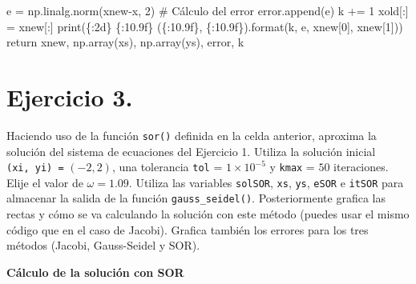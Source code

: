 \documentclass[
  letterpaper,
  DIV=11,
  numbers=noendperiod]{scrreprt}
\newenvironment{Shaded}{\begin{snugshade}}{\end{snugshade}}
\newcommand{\BuiltInTok}[1]{\textcolor[rgb]{0.00,0.23,0.31}{#1}}
\newcommand{\CommentTok}[1]{\textcolor[rgb]{0.37,0.37,0.37}{#1}}
\newcommand{\ControlFlowTok}[1]{\textcolor[rgb]{0.00,0.23,0.31}{#1}}
\newcommand{\DecValTok}[1]{\textcolor[rgb]{0.68,0.00,0.00}{#1}}
\newcommand{\NormalTok}[1]{\textcolor[rgb]{0.00,0.23,0.31}{#1}}
\newcommand{\OperatorTok}[1]{\textcolor[rgb]{0.37,0.37,0.37}{#1}}
\newcommand{\SpecialCharTok}[1]{\textcolor[rgb]{0.37,0.37,0.37}{#1}}
\newcommand{\StringTok}[1]{\textcolor[rgb]{0.13,0.47,0.30}{#1}}
\begin{document}
\begin{Shaded}
\begin{Highlighting}[]
\NormalTok{        e }\OperatorTok{=}\NormalTok{ np.linalg.norm(xnew}\OperatorTok{{-}}\NormalTok{x, }\DecValTok{2}\NormalTok{) }\CommentTok{\# Cálculo del error}
\NormalTok{        error.append(e)}
\NormalTok{        k }\OperatorTok{+=} \DecValTok{1}
\NormalTok{        xold[:] }\OperatorTok{=}\NormalTok{ xnew[:]}
        \BuiltInTok{print}\NormalTok{(}\StringTok{\textquotesingle{}}\SpecialCharTok{\{:2d\}}\StringTok{ }\SpecialCharTok{\{:10.9f\}}\StringTok{ (}\SpecialCharTok{\{:10.9f\}}\StringTok{, }\SpecialCharTok{\{:10.9f\}}\StringTok{)\textquotesingle{}}\NormalTok{.}\BuiltInTok{format}\NormalTok{(k, e, xnew[}\DecValTok{0}\NormalTok{], xnew[}\DecValTok{1}\NormalTok{]))}
    \ControlFlowTok{return}\NormalTok{ xnew, np.array(xs), np.array(ys), error, k}
\end{Highlighting}
\end{Shaded}

\section{\texorpdfstring{\textbf{Ejercicio
3.}}{Ejercicio 3.}}\label{ejercicio-3.-2}

Haciendo uso de la función \texttt{sor()} definida en la celda anterior,
aproxima la solución del sistema de ecuaciones del Ejercicio 1. Utiliza
la solución inicial \texttt{(xi,\ yi)\ =} \((-2, 2)\), una tolerancia
\texttt{tol} = \(1 \times 10^{-5}\) y \texttt{kmax} = \(50\)
iteraciones. Elije el valor de \(\omega = 1.09\). Utiliza las variables
\texttt{solSOR}, \texttt{xs}, \texttt{ys}, \texttt{eSOR} e
\texttt{itSOR} para almacenar la salida de la función
\texttt{gauss\_seidel()}. Posteriormente grafica las rectas y cómo se va
calculando la solución con este método (puedes usar el mismo código que
en el caso de Jacobi). Grafica también los errores para los tres métodos
(Jacobi, Gauss-Seidel y SOR).

\textbf{Cálculo de la solución con SOR}
\end{document}

